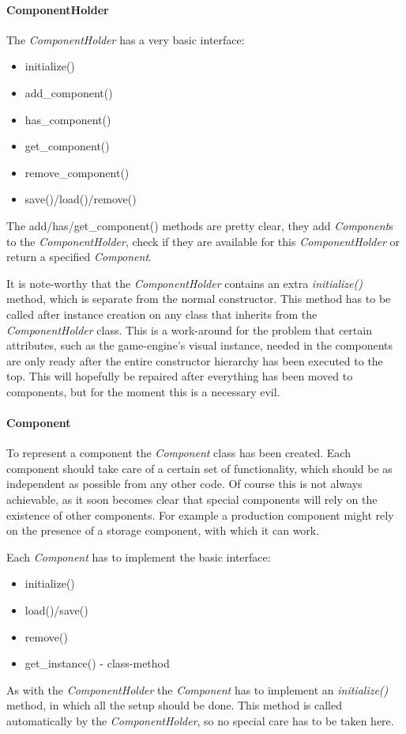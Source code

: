 \pagebreak

\paragraph{ComponentHolder}
The \textit{ComponentHolder} has a very basic interface:
\begin{itemize}
    \item initialize()
    \item add\_component()
    \item has\_component()
    \item get\_component()
    \item remove\_component()
    \item save()/load()/remove()
\end{itemize}
The add/has/get\_component() methods are pretty clear, they add \textit{Component}s to the \textit{ComponentHolder}, check if
they are available for this \textit{ComponentHolder} or return a specified \textit{Component}.

It is note-worthy that the \textit{ComponentHolder} contains an extra \textit{initialize()} method, which is separate from the
normal constructor. This method has to be called after instance creation on any class that inherits from the
\textit{ComponentHolder} class. This is a work-around for the problem that certain attributes, such as the game-engine's
visual instance, needed in the components are only ready after the entire constructor hierarchy has been executed to the
top. This will hopefully be repaired after everything has been moved to components, but for the moment this is a
necessary evil.

\paragraph{Component}
To represent a component the \textit{Component} class has been created. Each component should take care of a certain set
of functionality, which should be as independent as possible from any other code. Of course this is not always
achievable, as it soon becomes clear that special components will rely on the existence of other components. For example
a production component might rely on the presence of a storage component, with which it can work.

Each \textit{Component} has to implement the basic interface:
\begin{itemize}
    \item initialize()
    \item load()/save()
    \item remove()
    \item get\_instance() - class-method
\end{itemize}
As with the \textit{ComponentHolder} the \textit{Component} has to implement an \textit{initialize()} method, in which
all the setup should be done. This method is called automatically by the \textit{ComponentHolder}, so no special care
has to be taken here.

